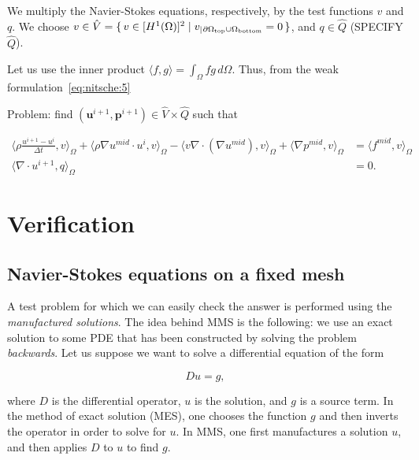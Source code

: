 \documentclass[11pt,a4paper,titlepage]{report}
\begin{document}
We multiply the Navier-Stokes equations, respectively, by the test functions $v$ and $q$. We choose $v \in \hat{V} = \set{v \in [H^1(\Omega)]^2 | v_|{_{\partial \Omega_{\rm top} \cup \Omega_{\rm bottom}}} = 0}$, and $q \in \hat{Q}$ (SPECIFY $\hat{Q}$).


Let us use the inner product $\langle f,g \rangle = \int_{\Omega} fg \, d\Omega$. Thus, from the weak formulation~\eqref{eq:nitsche:5}

Problem: find $(\mathbf{u}^{i+1}, \mathbf{p}^{i+1}) \in \hat{V} \times \hat{Q}$ such that

\begin{align}
\langle \rho \frac{u^{i+1} - u^i}{\Delta t},v \rangle_\Omega
+ \langle \rho \nabla u^{mid} \cdot u^i  ,v \rangle_\Omega
- \langle v \nabla \cdot (\nabla u^{mid}) ,v \rangle_\Omega
+ \langle \nabla p^{mid} ,v \rangle_\Omega & = \langle f^{mid} ,v \rangle_\Omega \\
\langle \nabla \cdot u^{i+1},q \rangle_\Omega &=0 .
\end{align}



\chapter{Verification}

\section{Navier-Stokes equations on a fixed mesh}



A test problem for which we can easily check the answer is performed using the \textit{manufactured solutions}. The idea behind MMS is the following: we use an exact solution to some PDE that has been constructed by solving the problem \textit{backwards}. Let us suppose we want to solve a differential equation of the form

\[
Du = g,
\]

where $D$ is the differential operator, $u$ is the solution, and $g$ is a source term. In the method of exact solution (MES), one chooses the function $g$ and then inverts the operator in order to solve for $u$. In MMS, one first manufactures a solution $u$, and then applies $D$ to $u$ to find $g$. \\
\end{document}
